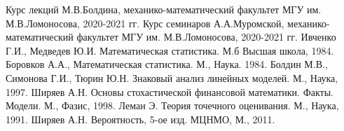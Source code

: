 \cleardoublepage
{}
{}
\begin{thebibliography}{}
		Курс лекций М.В.Болдина, механико-математический факультет МГУ им. М.В.Ломоносова, 2020-2021 гг.
		Курс семинаров А.А.Муромской, механико-математический факультет МГУ им. М.В.Ломоносова, 2020-2021 гг.
		Ивченко Г.И., Медведев Ю.И. Математическая статистика. М.б Высшая школа, 1984.
		Боровков А.А., Математическая статистика. М., Наука. 1984.
		Болдин М.В., Симонова Г.И., Тюрин Ю.Н. Знаковый анализ линейных моделей. М., Наука, 1997.
		Ширяев А.Н. Основы стохастической финансовой математики. Факты. Модели. М., Фазис, 1998.
		Леман Э. Теория точечного оценивания. М., Наука, 1991.
		Ширяев А.Н. Вероятность, 5-ое изд. МЦНМО, М., 2011.
\end{thebibliography}